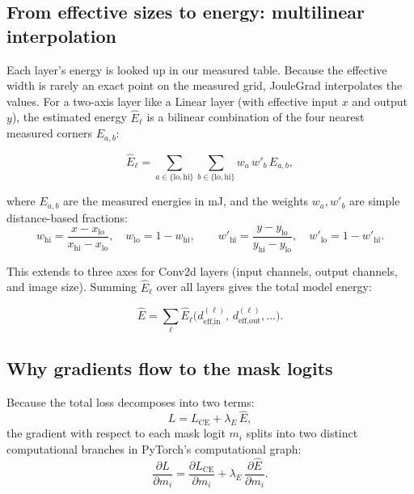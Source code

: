 \subsection{From effective sizes to energy: multilinear interpolation}

Each layer's energy is looked up in our measured table. Because the effective width is rarely an exact point on the measured grid, JouleGrad interpolates the values. For a two-axis layer like a Linear layer (with effective input $x$ and output $y$), the estimated energy $\widehat{E}_\ell$ is a bilinear combination of the four nearest measured corners $E_{a,b}$:

$$
\widehat{E}_{\ell} = \sum_{a \in \{\text{lo}, \text{hi}\}} \sum_{b \in \{\text{lo}, \text{hi}\}} w_a\, w'_b\, E_{a,b},
$$

where $E_{a,b}$ are the measured energies in mJ, and the weights $w_a, w'_b$ are simple distance-based fractions:
$$
w_{\text{hi}} = \frac{x - x_{\text{lo}}}{x_{\text{hi}} - x_{\text{lo}}}, \quad w_{\text{lo}} = 1 - w_{\text{hi}}, \qquad
w'_{\text{hi}} = \frac{y - y_{\text{lo}}}{y_{\text{hi}} - y_{\text{lo}}}, \quad w'_{\text{lo}} = 1 - w'_{\text{hi}}.
$$

This extends to three axes for Conv2d layers (input channels, output channels, and image size). Summing $\widehat{E}_\ell$ over all layers gives the total model energy:

$$
\widehat{E} = \sum_{\ell} \widehat{E}_{\ell}
\big(d^{(\ell)}_{\text{eff,in}},\, d^{(\ell)}_{\text{eff,out}}, \dots\big).
$$

\subsection{Why gradients flow to the mask logits}

Because the total loss decomposes into two terms:
$$
L = L_{\text{CE}} + \lambda_E\,\widehat{E},
$$
the gradient with respect to each mask logit $m_i$ splits into two distinct computational branches in PyTorch's computational graph:
$$
\frac{\partial L}{\partial m_i} = \frac{\partial L_{\text{CE}}}{\partial m_i} + \lambda_E\,\frac{\partial \widehat{E}}{\partial m_i}.
$$

